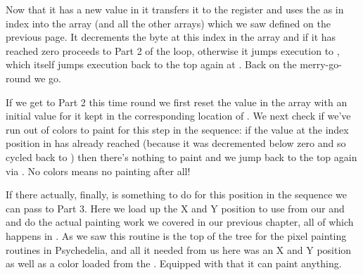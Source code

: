 Now that it has a new value in  it transfers it to the  register and uses the 
 as in index into the  array (and all the other arrays) which we saw defined on the previous 
page. It decrements the byte at this index in the  array and if it has reached zero
proceeds to Part 2 of the loop, otherwise it jumps execution to , which itself jumps execution
back to the top again at . Back on the merry-go-round we go.

If we get to Part 2 this time round we first reset the value in the  array with an initial value for it kept in the corresponding
location of . We next check if we've run out of colors to paint for this step
in the sequence: if the value at the index position in  has already reached  (because
it was decremented below zero and so cycled back to ) then there's nothing to paint and we jump back to the top
again via . No colors means no painting after all!

If there actually, finally, is something to do for this position in the sequence we can pass to Part 3. Here we load up the X and Y
position to use from our  and  and do the actual painting work we covered
in our previous chapter, all of which happens in . As we saw this routine is the top of the
tree for the pixel painting routines in Psychedelia, and all it needed from us here was an X and Y position as well as a color
loaded from the . Equipped with that it can paint anything. 

